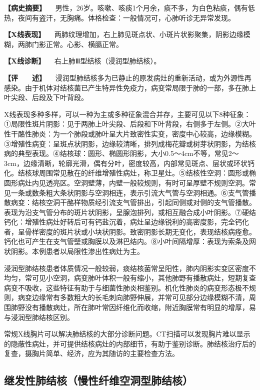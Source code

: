 \textbf{【病史摘要】}
　男性，26岁。咳嗽、咳痰1个月余，痰不多，为白色粘痰，偶有低热，夜间有盗汗，无胸痛。体格检查：一般情况可，心肺听诊无异常发现。

\textbf{【X线表现】}
　两肺纹理增加，右上肺见斑点状、小斑片状影聚集，阴影边缘模糊，两肺门影正常。心影、横膈正常。

\textbf{【X线诊断】} 　右上肺Ⅲ型结核（浸润型肺结核）。

\textbf{【评　　述】}
　浸润型肺结核多为已静止的原发病灶的重新活动，或为外源性再感染。由于机体对结核菌已产生特异性免疫力，病变常局限于肺的一部，多在肺上叶尖段、后段及下叶背段。

X线表现多种多样，可以一种为主或多种征象混合并存，主要可见以下8种征象：①局限性斑片阴影：见于两肺上叶尖段、后段和下叶背段，右侧多于左侧。②大叶性干酪性肺炎：为一个肺段或肺叶呈大片致密性实变，密度中心较高，边缘模糊。③增殖性病变：呈斑点状阴影，边缘较清晰，排列成梅花瓣或树芽状阴影，为结核病的典型表现。④结核球：圆形、椭圆形阴影，大小0.5～4cm不等，常见2～3cm，边缘清晰，轮廓光滑，偶有分叶，密度较高，内部常见斑点、层状或环状钙化。结核球周围常见散在的纤维增殖性病灶，称卫星灶。⑤结核性空洞：圆形或椭圆形病灶内见透亮区。空洞壁薄，内壁一般较规则，有时可呈厚壁不规则空洞。常见一条或数条粗大条状阴影与空洞相连，表示引流大气管与空洞相通。⑥支气管播散病变：结核空洞干酪样物质经引流支气管排出，引起同侧或对侧的支气管播散。表现为沿支气管分布的斑片状阴影，呈腺泡排列，或相互融合成小叶阴影。⑦硬结钙化：增殖性病灶好转后可有钙盐沉着，病灶呈边缘锐利的高密度影，完全钙化者，呈骨样密度的斑片状或小块状阴影。致密阴影长期无变化，表现结核病痊愈。钙化也可产生在支气管壁或胸膜以及淋巴结内。⑧小叶间隔增厚：表现为索条及网状阴影。本例患者以局限性渗出性病灶为主。

浸润型肺结核患者体质情况一般较弱，痰结核菌常呈阳性，肺内阴影实变区密度不均匀，常可见小空洞，病变肺叶体积一般有缩小，其他肺野有播散病灶，短期复查病变不吸收，这些特征有助于与细菌性肺炎相鉴别。机化性肺炎的病变形态极不规则，病变边缘常有多数粗大的长毛刺向肺野伸展，并常可见部分边缘模糊不清，周围肺野没有播散病灶，所在肺叶常因纤维化而收缩，附近胸膜常有明显的增厚，易与浸润型肺结核区别。

常规X线胸片可以解决肺结核的大部分诊断问题。CT扫描可以发现胸片难以显示的隐蔽性病灶，并可提供结核病灶的内部细节，有助于鉴别诊断。肺结核治疗后的复查，摄胸片简单、经济，应为其随访的主要检查方法。

\subsection{继发性肺结核（慢性纤维空洞型肺结核）}

